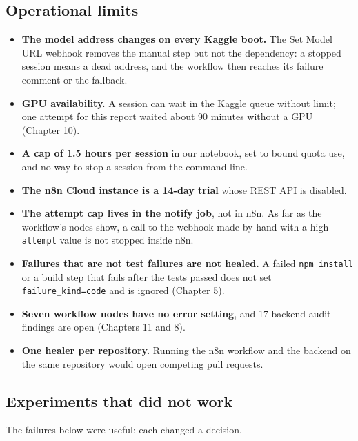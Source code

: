 \subsection{Operational limits}

\begin{itemize}[leftmargin=*, itemsep=2pt]
\item \textbf{The model address changes on every Kaggle boot.} The Set Model URL webhook removes the manual step but not the dependency: a stopped session means a dead address, and the workflow then reaches its failure comment or the fallback.
\item \textbf{GPU availability.} A session can wait in the Kaggle queue without limit; one attempt for this report waited about 90 minutes without a GPU (Chapter 10).
\item \textbf{A cap of 1.5 hours per session} in our notebook, set to bound quota use, and no way to stop a session from the command line.
\item \textbf{The n8n Cloud instance is a 14-day trial} whose REST API is disabled.
\item \textbf{The attempt cap lives in the notify job}, not in n8n. As far as the workflow's nodes show, a call to the webhook made by hand with a high \texttt{attempt} value is not stopped inside n8n.
\item \textbf{Failures that are not test failures are not healed.} A failed \texttt{npm install} or a build step that fails after the tests passed does not set \texttt{failure\_\allowbreak{}kind=code} and is ignored (Chapter 5).
\item \textbf{Seven workflow nodes have no error setting}, and 17 backend audit findings are open (Chapters 11 and 8).
\item \textbf{One healer per repository.} Running the n8n workflow and the backend on the same repository would open competing pull requests.
\end{itemize}

\subsection{Experiments that did not work}

The failures below were useful: each changed a decision.

